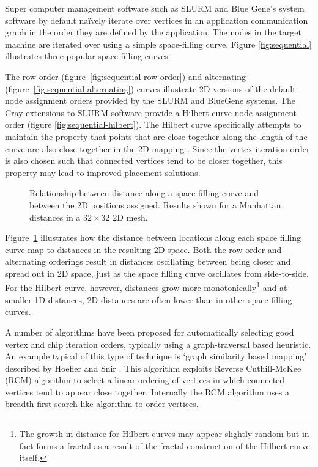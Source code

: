 				Super computer management software such as SLURM \cite{yoo03} and Blue
				Gene's system software \cite{gilge14} by default na\"ively iterate over
				vertices in an application communication graph in the order they are
				defined by the application. The nodes in the target machine are
				iterated over using a simple space-filling curve. Figure
				\ref{fig:sequential} illustrates three popular space filling
				curves.
				
				The row-order (figure~\ref{fig:sequential-row-order}) and alternating
				(figure~\ref{fig:sequential-alternating}) curves illustrate 2D versions
				of the default node assignment orders provided by the SLURM and
				BlueGene systems.  The Cray extensions to SLURM software provide a
				Hilbert curve \cite{hilbert91} node assignment order (figure
				\ref{fig:sequential-hilbert}). The Hilbert curve specifically attempts
				to maintain the property that points that are close together along the
				length of the curve are also close together in the 2D mapping
				\cite{moon01, zumbusch99}. Since the vertex iteration order is also
				chosen such that connected vertices tend to be closer together, this
				property may lead to improved placement solutions.
				
				\begin{figure}
					\center
					
					\caption{Relationship between distance along a space filling curve
					and between the 2D positions assigned. Results shown for a
					Manhattan distances in a $32\times32$ 2D mesh.}
					\label{fig:space_filling_curves_comparison}
				\end{figure}
				
				Figure~\ref{fig:space_filling_curves_comparison} illustrates how the
				distance between locations along each space filling curve map to
				distances in the resulting 2D space. Both the row-order and alternating
				orderings result in distances oscillating between being closer and
				spread out in 2D space, just as the space filling curve oscillates from
				side-to-side. For the Hilbert curve, however, distances grow more
				monotonically\footnote{The growth in distance for Hilbert curves may
				appear slightly random but in fact forms a fractal as a result of the
				fractal construction of the Hilbert curve itself.} and at smaller 1D
				distances, 2D distances are often lower than in other space filling
				curves.
				
				A number of algorithms have been proposed for automatically selecting
				good vertex and chip iteration orders, typically using a
				graph-traversal based heuristic. An example typical of this type of
				technique is `graph similarity based mapping' described by Hoefler and
				Snir \cite{hoefler11}. This algorithm exploits Reverse
				Cuthill-McKee (RCM) algorithm \cite{cuthill69} to select a linear
				ordering of vertices in which connected vertices tend to appear close
				together. Internally the RCM algorithm uses a breadth-first-search-like
				algorithm to order vertices.
				
